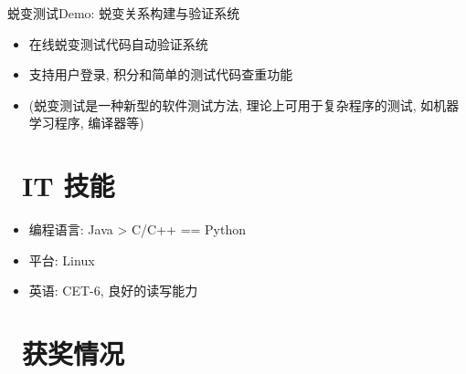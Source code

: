 \documentclass{resume}
\begin{document}
\begin{onehalfspacing}
蜕变测试Demo: 蜕变关系构建与验证系统
\begin{itemize}
  \item 在线蜕变测试代码自动验证系统
  \item 支持用户登录, 积分和简单的测试代码查重功能
  \item (蜕变测试是一种新型的软件测试方法, 理论上可用于复杂程序的测试, 如机器学习程序, 编译器等)
\end{itemize}
\end{onehalfspacing}

\section{\faCogs\ IT 技能}
\begin{itemize}[parsep=0.5ex]
  \item 编程语言: Java > C/C++ == Python
  \item 平台: Linux
  \item 英语: CET-6, 良好的读写能力
\end{itemize}

\section{\faHeartO\ 获奖情况}



\end{document}
